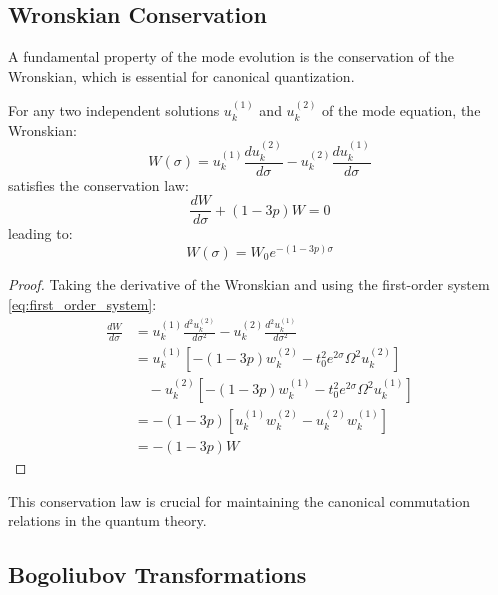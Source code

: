 \subsection{Wronskian Conservation}
\label{subsec:wronskian_conservation}

A fundamental property of the mode evolution is the conservation of the Wronskian, which is essential for canonical quantization.

\begin{theorem}
\label{thm:wronskian_conservation}
For any two independent solutions $u_k^{(1)}$ and $u_k^{(2)}$ of the mode equation, the Wronskian:
\begin{equation}
W(\sigma) = u_k^{(1)} \frac{d u_k^{(2)}}{d\sigma} - u_k^{(2)} \frac{d u_k^{(1)}}{d\sigma}
\end{equation}
satisfies the conservation law:
\begin{equation}
\frac{dW}{d\sigma} + (1-3p) W = 0
\end{equation}
leading to:
\begin{equation}
W(\sigma) = W_0 e^{-(1-3p)\sigma}
\label{eq:wronskian_evolution}
\end{equation}
\end{theorem}

\begin{proof}
Taking the derivative of the Wronskian and using the first-order system \eqref{eq:first_order_system}:
\begin{align}
\frac{dW}{d\sigma} &= u_k^{(1)} \frac{d^2 u_k^{(2)}}{d\sigma^2} - u_k^{(2)} \frac{d^2 u_k^{(1)}}{d\sigma^2} \\
&= u_k^{(1)} \left[ -(1-3p) w_k^{(2)} - t_0^2 e^{2\sigma} \Omega^2 u_k^{(2)} \right] \\
&\quad - u_k^{(2)} \left[ -(1-3p) w_k^{(1)} - t_0^2 e^{2\sigma} \Omega^2 u_k^{(1)} \right] \\
&= -(1-3p) \left[ u_k^{(1)} w_k^{(2)} - u_k^{(2)} w_k^{(1)} \right] \\
&= -(1-3p) W
\end{align}
\end{proof}

This conservation law is crucial for maintaining the canonical commutation relations in the quantum theory.

\subsection{Bogoliubov Transformations}
\label{subsec:bogoliubov_transformations}

